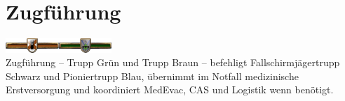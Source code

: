 \section{Zugführung}
\includegraphics[width=20mm]{./img/truppenordnung/zugfuehrung/TrBraun}\quad\includegraphics[width=20mm]{./img/truppenordnung/zugfuehrung/TrGruen}\\
Zugführung -- Trupp Grün und Trupp Braun -- befehligt Fallschirmjägertrupp Schwarz und Pioniertrupp Blau, übernimmt im Notfall medizinische Erstversorgung und koordiniert \ac{MedEvac}, \ac{CAS} und Logistik wenn benötigt. 